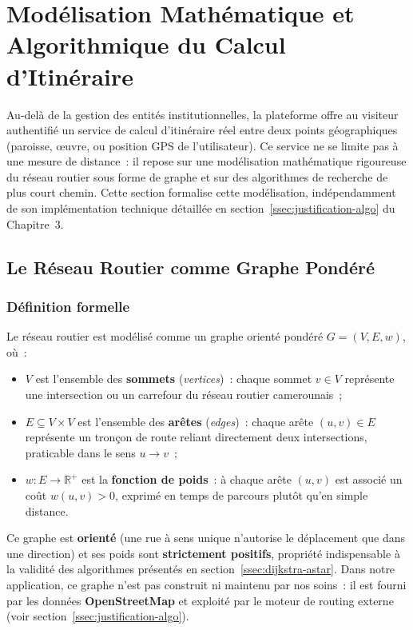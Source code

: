 \documentclass[12pt, a4paper]{report}
\begin{document}
\section{Modélisation Mathématique et Algorithmique du Calcul d'Itinéraire}
\label{sec:modelisation-math}

Au-delà de la gestion des entités institutionnelles, la plateforme offre au
visiteur authentifié un service de calcul d'itinéraire réel entre deux points
géographiques (paroisse, œuvre, ou position GPS de l'utilisateur). Ce service ne
se limite pas à une mesure de distance~: il repose sur une modélisation
mathématique rigoureuse du réseau routier sous forme de graphe et sur des
algorithmes de recherche de plus court chemin. Cette section formalise cette
modélisation, indépendamment de son implémentation technique détaillée en
section~\ref{ssec:justification-algo} du Chapitre~3.

\subsection{Le Réseau Routier comme Graphe Pondéré}
\label{ssec:modele-graphe}

\subsubsection{Définition formelle}

Le réseau routier est modélisé comme un graphe orienté pondéré
$G = (V, E, w)$, où~:
\begin{itemize}[itemsep=2pt, topsep=4pt, leftmargin=1.5cm]
  \item $V$ est l'ensemble des \textbf{sommets} (\textit{vertices})~: chaque
    sommet $v \in V$ représente une intersection ou un carrefour du réseau
    routier camerounais~;
  \item $E \subseteq V \times V$ est l'ensemble des \textbf{arêtes}
    (\textit{edges})~: chaque arête $(u, v) \in E$ représente un tronçon de
    route reliant directement deux intersections, praticable dans le sens
    $u \rightarrow v$~;
  \item $w : E \rightarrow \mathbb{R}^{+}$ est la \textbf{fonction de poids}~:
    à chaque arête $(u, v)$ est associé un coût $w(u, v) > 0$, exprimé en
    temps de parcours plutôt qu'en simple distance.
\end{itemize}

Ce graphe est \textbf{orienté} (une rue à sens unique n'autorise le
déplacement que dans une direction) et ses poids sont \textbf{strictement
positifs}, propriété indispensable à la validité des algorithmes présentés en
section~\ref{ssec:dijkstra-astar}. Dans notre application, ce graphe n'est
pas construit ni maintenu par nos soins~: il est fourni par les données
\textbf{OpenStreetMap} et exploité par le moteur de routing externe (voir
section~\ref{ssec:justification-algo}).
\end{document}
